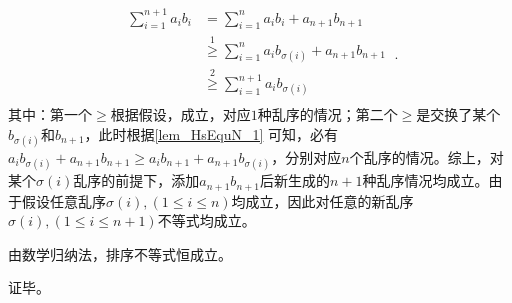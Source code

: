 \begin{equation}
\begin{split}
\sum_{i=1}^{n+1} a_i b_i&=\sum_{i=1}^n a_i b_i+a_{n+1}b_{n+1}\\
&\overset{\mathrm{1}}{\geq} \sum_{i=1}^n a_i b_{\sigma(i)} +a_{n+1}b_{n+1} \\ 
&\overset{\mathrm{2}}{\geq} \sum_{i=1}^{n+1} a_i b_{\sigma(i)} \\
\end{split}~.
\end{equation}
其中：第一个$\geq$根据假设，成立，对应$1$种乱序的情况；第二个$\geq$是交换了某个$b_{\sigma(i)}$和$b_{n+1}$，此时根据\autoref{lem_HsEquN_1} 可知，必有$a_i b_{\sigma(i)}+a_{n+1}b_{n+1}\geq a_ib_{n+1} +a_{n+1}b_{\sigma(i)}$，分别对应$n$个乱序的情况。综上，对某个$\sigma(i)$乱序的前提下，添加$a_{n+1}b_{n+1}$后新生成的$n+1$种乱序情况均成立。由于假设任意乱序$\sigma(i),(1\leq i\leq n)$均成立，因此对任意的新乱序$\sigma(i),(1\leq i\leq n+1)$不等式均成立。

由数学归纳法，排序不等式恒成立。

证毕。

